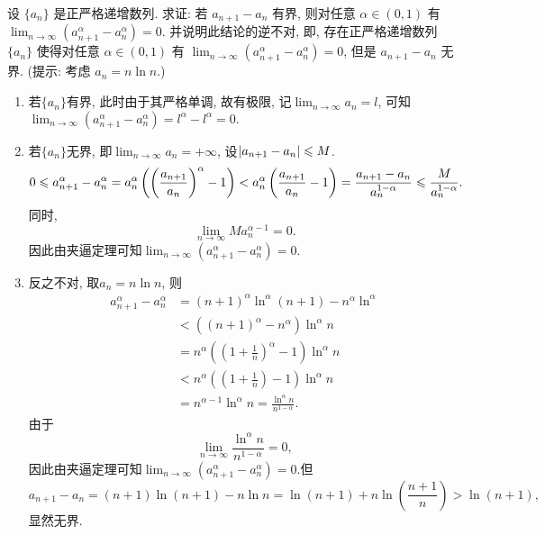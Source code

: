 \begin{exercise}[1.C.6]
    设 $\{a_n\}$ 是正严格递增数列. 求证: 若 $a_{n+1}-a_n$ 有界,  则对任意 $\alpha \in (0, 1)$ 有 $\lim_{n \to \infty} (a_{n+1}^\alpha - a_n^\alpha) = 0$. 并说明此结论的逆不对,  即,  存在正严格递增数列 $\{a_n\}$ 使得对任意 $\alpha \in (0, 1)$ 有 $\lim_{n \to \infty} (a_{n+1}^\alpha - a_n^\alpha) = 0$,  但是 $a_{n+1}-a_n$ 无界. (提示: 考虑 $a_n = n\ln n$.)
\end{exercise}

\begin{solution}
    \begin{enumerate}[(1)]
        \item 若$\{a_n\}$有界, 此时由于其严格单调, 故有极限, 记$\lim_{n\to\infty}a_n=l$, 可知$\lim_{n \to \infty} (a_{n+1}^\alpha - a_n^\alpha) = l^\alpha-l^\alpha=0.$
        \item 若$\{a_n\}$无界, 即$\lim_{n\to\infty}a_n=+\infty$, 设$\left|a_{n+1}-a_n\right| \leqslant M$.
              \begin{align*}
                  0\leqslant a_{n+1}^\alpha - a_n^\alpha & =a_n^\alpha\left(\left(\frac{a_{n+1}}{a_n}\right)^\alpha - 1\right) <a_n^\alpha\left(\frac{a_{n+1}}{a_n} - 1\right)=\frac{a_{n+1}-a_n}{a_n^{1-\alpha}} \leqslant\frac{M}{a_n^{1-\alpha}}.
              \end{align*}
              同时, $$\lim_{n\to\infty}Ma_n^{\alpha-1}=0.$$
              因此由夹逼定理可知$\lim_{n \to \infty} (a_{n+1}^\alpha - a_n^\alpha) = 0$.
        \item 反之不对, 取$a_n=n\ln n$, 则\begin{align*}
                  a_{n+1}^\alpha-a_n^\alpha & =(n+1)^\alpha\ln^\alpha(n+1)-n^\alpha\ln^\alpha                       \\
                                            & <\left((n+1)^\alpha-n^\alpha\right)\ln^\alpha n                       \\
                                            & =n^\alpha\left(\left(1+\frac{1}{n}\right)^\alpha-1\right)\ln^\alpha n \\
                                            & <n^\alpha\left(\left(1+\frac{1}{n}\right)-1\right)\ln^\alpha n        \\
                                            & =n^{\alpha-1}\ln^\alpha n=\frac{\ln^\alpha n}{n^{1-\alpha}}.
              \end{align*}
              由于$$\lim_{n\to\infty}\frac{\ln^\alpha n}{n^{1-\alpha}}=0, $$因此由夹逼定理可知$\lim_{n \to \infty} (a_{n+1}^\alpha - a_n^\alpha) = 0$.但$$a_{n+1}-a_n=(n+1)\ln(n+1)-n\ln n=\ln (n+1)+n\ln\left(\frac{n+1}{n}\right)>\ln(n+1), $$显然无界.
    \end{enumerate}
\end{solution}

